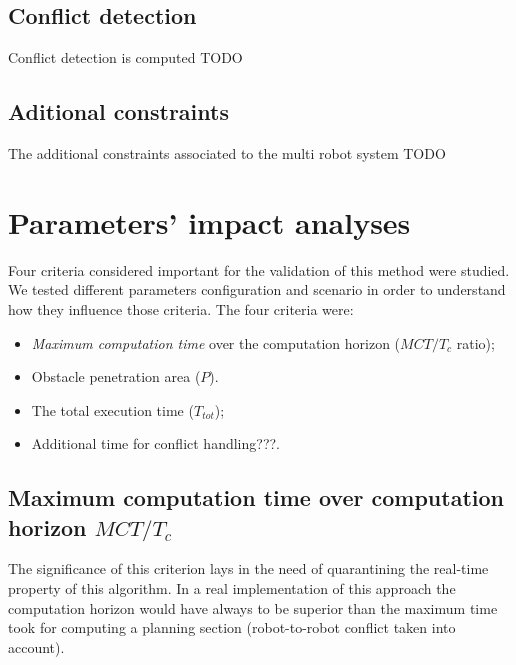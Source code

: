 \documentclass[eprint]{actapoly}
\begin{document}
\subsection{Conflict detection}

Conflict detection is computed TODO

\subsection{Aditional constraints}

The additional constraints associated to the multi robot system TODO



\section{Parameters' impact analyses}

Four criteria considered important for the validation of this method were studied.
We tested different parameters configuration and scenario in order to understand how they influence
those criteria.
The four criteria were:

\begin{itemize}

\item
\textit{Maximum computation time} over the computation horizon ($MCT/T_c$ ratio);

\item
Obstacle penetration area ($P$).

\item
The total execution time ($T_{tot}$);


\item
Additional time for conflict handling???.

\end{itemize}

\subsection{Maximum computation time over computation horizon $MCT/T_c$}

The significance of this criterion lays in the need of quarantining the real-time property of this algorithm.
In a real implementation of this approach the computation horizon would have always to be superior than the
maximum time took for computing a planning section (robot-to-robot conflict taken into account).
\end{document}
